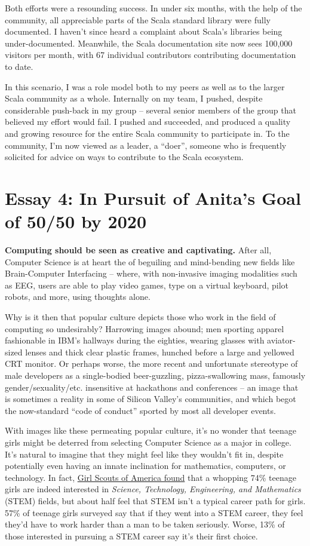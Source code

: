 \documentclass[acmtocl]{acmtrans2m}
\begin{document}
Both efforts were a resounding success. In under six months, with the help of
the community, all appreciable parts of the Scala standard library were fully
documented. I haven't since heard a complaint about Scala's libraries being
under-documented. Meanwhile, the Scala documentation site now sees 100,000
visitors per month, with 67 individual contributors contributing
documentation to date.

In this scenario, I was a role model both to my peers as well as to the larger
Scala community as a whole. Internally on my team, I pushed, despite
considerable push-back in my group -- several senior members of the group that
believed my effort would fail. I pushed and succeeded, and produced a quality
and growing resource for the entire Scala community to participate in. To the
community, I'm now viewed as a leader, a ``doer'', someone who is frequently
solicited for advice on ways to contribute to the Scala ecosystem.


\section*{\textbf{Essay 4:} In Pursuit of Anita's Goal of 50/50 by 2020}

\textbf{Computing should be seen as creative and captivating.}
After all, Computer Science is at heart the of beguiling and mind-bending new
fields like {Brain-Computer} Interfacing -- where, with non-invasive imaging
modalities such as EEG, users are able to play video games, type on a virtual
keyboard, pilot robots, and more, using thoughts alone.

Why is it then that popular culture depicts those who work in the field of
computing so undesirably? Harrowing images abound; men sporting apparel
fashionable in IBM's hallways during the eighties, wearing glasses with
aviator-sized lenses and thick clear plastic frames, hunched before a large
and yellowed CRT monitor. Or perhaps worse, the more recent and unfortunate
stereotype of male developers as a {single-bodied} {beer-guzzling},
{pizza-swallowing} mass, famously gender/sexuality/etc. insensitive at
hackathons and conferences -- an image that is sometimes a reality in
some of Silicon Valley's communities, and which begot the {now-standard} ``code
of conduct'' sported by most all developer events.

With images like these permeating popular culture, it's no wonder that teenage
girls might be deterred from selecting Computer Science as a major in college.
It's natural to imagine that they might feel like they wouldn't fit in,
despite potentially even having an innate inclination for mathematics,
computers, or technology. In fact,
\href{https://www.girlscouts.org/research/pdf/generation\_stem\_full\_report.pdf}{Girl Scouts of America found}
\cite{Girlscouts} that a whopping 74\% teenage girls are indeed interested in {\em
Science, Technology, Engineering, and Mathematics} (STEM) fields, but about
half feel that STEM isn't a typical career path for girls. 57\% of teenage
girls surveyed say that if they went into a STEM career, they feel they'd have
to work harder than a man to be taken seriously. Worse, 13\% of those
interested in pursuing a STEM career say it's their first choice.
\end{document}
